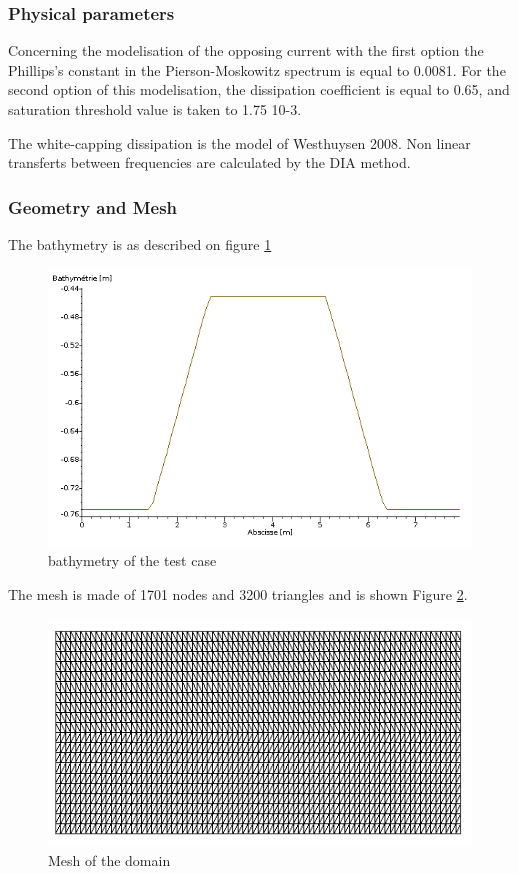 \subsubsection{Physical parameters}
 Concerning the modelisation of the opposing current with the first option the Phillips’s constant in the Pierson-Moskowitz spectrum is equal to 0.0081.
For the second option of this modelisation, the dissipation coefficient is equal to 0.65, and saturation threshold value is taken to 1.75 10-3.

The white-capping dissipation is the model of Westhuysen 2008. Non linear transferts between frequencies are calculated by the DIA method.

%
%
%
\subsubsection{Geometry and Mesh}
%
The bathymetry is as described on figure \ref{bathyop}
\begin{figure} [!h]
\centering
\includegraphics[scale = 0.65]{bathymetrie.png}
 \caption{bathymetry of the test case }
\label{bathyop}
\end{figure}

The mesh is made of 1701 nodes and 3200 triangles  and is shown Figure \ref{mailop}.
\begin{figure} [!h]
\centering
\includegraphics[scale = 0.65]{maillage.png}
 \caption{Mesh of the domain}
\label{mailop}
\end{figure}



